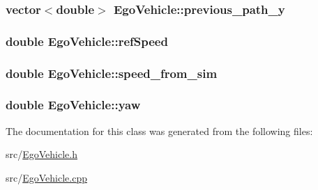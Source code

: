 \subsubsection[{\texorpdfstring{previous\+\_\+path\+\_\+y}{previous_path_y}}]{\setlength{\rightskip}{0pt plus 5cm}vector$<$double$>$ Ego\+Vehicle\+::previous\+\_\+path\+\_\+y\hspace{0.3cm}{\ttfamily [protected]}}\hypertarget{classEgoVehicle_aaf1ac96664e7d8e608c710329eed2a3d}{}\label{classEgoVehicle_aaf1ac96664e7d8e608c710329eed2a3d}
\subsubsection[{\texorpdfstring{ref\+Speed}{refSpeed}}]{\setlength{\rightskip}{0pt plus 5cm}double Ego\+Vehicle\+::ref\+Speed\hspace{0.3cm}{\ttfamily [protected]}}\hypertarget{classEgoVehicle_a80a9ae1a27a7368cd10f22ac08edcbd3}{}\label{classEgoVehicle_a80a9ae1a27a7368cd10f22ac08edcbd3}
\subsubsection[{\texorpdfstring{speed\+\_\+from\+\_\+sim}{speed_from_sim}}]{\setlength{\rightskip}{0pt plus 5cm}double Ego\+Vehicle\+::speed\+\_\+from\+\_\+sim\hspace{0.3cm}{\ttfamily [protected]}}\hypertarget{classEgoVehicle_af0238faf0f998a051b04417bff609315}{}\label{classEgoVehicle_af0238faf0f998a051b04417bff609315}
\subsubsection[{\texorpdfstring{yaw}{yaw}}]{\setlength{\rightskip}{0pt plus 5cm}double Ego\+Vehicle\+::yaw\hspace{0.3cm}{\ttfamily [protected]}}\hypertarget{classEgoVehicle_ae99585d114a39d671d04c19da303e473}{}\label{classEgoVehicle_ae99585d114a39d671d04c19da303e473}


The documentation for this class was generated from the following files\+:\begin{DoxyCompactItemize}
\item 
src/\hyperlink{EgoVehicle_8h}{Ego\+Vehicle.\+h}\item 
src/\hyperlink{EgoVehicle_8cpp}{Ego\+Vehicle.\+cpp}\end{DoxyCompactItemize}
